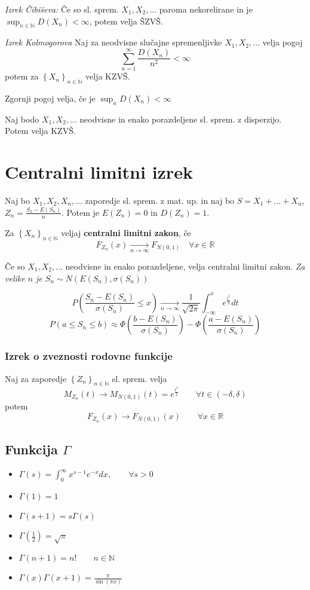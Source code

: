 \begin{multicols}{5}
\textit{Izrek Čibiševa:}
Če so sl. sprem. $ X_1, X_2, \dots $ paroma nekorelirane in je $\sup_{n \in \mathbb{N}} D(X_n) < \infty$, potem velja ŠZVŠ.

\textit{Izrek Kolmogorova}
Naj za neodvisne slučajne spremenljivke $X_1, X_2, \dots$ velja pogoj
\[ \sum_{n=1}^\infty \frac{D(X_n)}{n^2} < \infty\]
potem za  $\left\{ X_n \right\}_{n \in \mathbb{N}} $ velja KZVŠ.

Zgornji pogoj velja, če je $\sup_n D(X_n) < \infty$

Naj bodo  $X_1, X_2, \dots$ neodvisne in enako porazdeljene sl. sprem. z disperzijo. Potem velja KZVŠ.

\section{Centralni limitni izrek}
Naj bo $X_1, X_2, X_n, \dots$ zaporedje sl. sprem. z mat. up. in naj bo $S = X_1 +\dots + X_n$, $Z_n = \frac{S_n - E(S_n)}{n}$. Potem je $E(Z_n) = 0$ in $D(Z_n) = 1$.

Za $\left\{ X_n \right\}_{n \in \mathbb{N}} $ veljaj \textbf{centralni limitni zakon}, če
\[ F_{Z_n}(x) \xrightarrow[n \to \infty]{} F_{N(0,1)}  \quad \forall x \in \mathbb{R}\]

Če so $X_1, X_2, \dots$ neodvisne in enako porazdeljene, velja centralni limitni zakon.
\textit{Za velike $n$ je $S_n \sim N(E(S_n), \sigma(S_n))$}

\[ P\left(\frac{S_n - E(S_n)}{\sigma(S_n)} \leq x \right) \xrightarrow[n \to \infty]{} \frac{1}{\sqrt{2\pi}} \int_{-\infty}^{x} e^{\frac{t^2}{2}} dt\]
\[ P(a \leq S_n \leq b) \approx \Phi\left(\frac{b-E(S_n)}{\sigma(S_n)}\right) - \Phi\left(\frac{a-E(S_n)}{\sigma(S_n)}\right)  \]


\subsubsection{Izrek o zveznosti rodovne funkcije}

Naj za zaporedje $\left\{ Z_n \right\}_{n \in \mathbb{N}} $ sl. sprem. velja
\[ M_{Z_n}(t) \to M_{N(0,1)}(t) = e^{\frac{t^2}{2}} \qquad \forall t \in (-\delta, \delta)\]
potem
\[ F_{Z_n}(x) \to F_{N(0,1)}(x)  \qquad \forall x \in \mathbb{R}\]


\subsection*{Funkcija $\Gamma$}
\begin{itemize}
    \item $ \Gamma(s) = \int_0^{\infty} x^{s-1} e^{-x} dx, \qquad \forall s > 0 $
    \item $\Gamma(1) = 1$
    \item $\Gamma(s+1) = s \Gamma(s)$
    \item $\Gamma(\frac{1}{2}) = \sqrt{\pi}$
    \item $\Gamma(n+1) = n!\qquad n\in \mathbb{N}$
    \item $\Gamma(x)\Gamma(x+1) = \frac{\pi}{\sin(\pi x)}$
\end{itemize}


\end{multicols}
